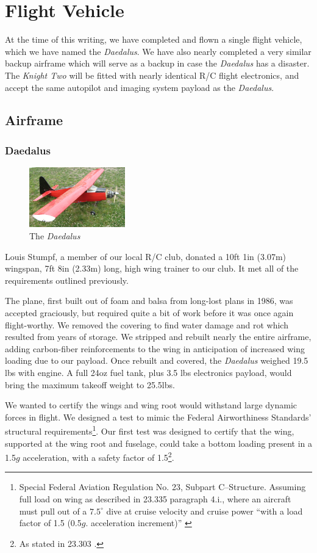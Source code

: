 \documentclass[10pt]{report}
\newcommand{\degrees}[1]
{
\begin{math}
#1^{\circ} 
\end{math}
}
\begin{document}
\section{Flight Vehicle}

At the time of this writing, we have completed and flown a single flight vehicle, which we have named the \emph{Daedalus}.
We have also nearly completed a very similar backup airframe which will serve as a backup in case the \emph{Daedalus} has a disaster. The \emph{Knight Two} will be fitted with nearly identical R/C flight electronics, and accept the same autopilot and imaging system payload as the \emph{Daedalus}.

\subsection{Airframe}

\subsubsection{Daedalus}
\begin{figure}
	\includegraphics[width=0.37\textwidth]{../images/daedalus_isometric.jpg}
	\caption{The \emph{Daedalus}}
	\label{fig:daedalus}
\end{figure}
Louis Stumpf, a member of our local R/C club, donated a 10ft 1in (3.07m) wingspan, 7ft 8in (2.33m) long, high wing trainer to our club. It met all of the requirements outlined previously.

The plane, first built out of foam and balsa from long-lost plans in 1986, was accepted graciously, but required quite a bit of work before it was once again flight-worthy. We removed the covering to find water damage and rot which resulted from years of storage. We stripped and rebuilt nearly the entire airframe, adding carbon-fiber reinforcements to the wing in anticipation of increased wing loading due to our payload. Once rebuilt and covered,  the \emph{Daedalus} weighed 19.5 lbs with engine. A full 24oz fuel tank, plus 3.5 lbs electronics payload, would bring the maximum takeoff weight to 25.5lbs.

We wanted to certify the wings and wing root would withstand large dynamic forces in flight. 
We designed a test to mimic the 
Federal Airworthiness Standards' structural requirements\footnote{Special Federal Aviation Regulation No. 23, Subpart C--Structure. Assuming full load on wing as described in 23.335 paragraph 4.i., where an aircraft must pull out of a \degrees{7.5} dive at cruise velocity and cruise power ``with a load factor of 1.5 (0.5$g$. acceleration increment)'' \cite{far23}}. Our first test was designed to certify that the wing, supported at the wing root and fuselage, could take a bottom loading present in a 1.5$g$ acceleration, with a safety factor of 1.5\footnote{As stated in 23.303 \cite{far23}.}.
\end{document}
